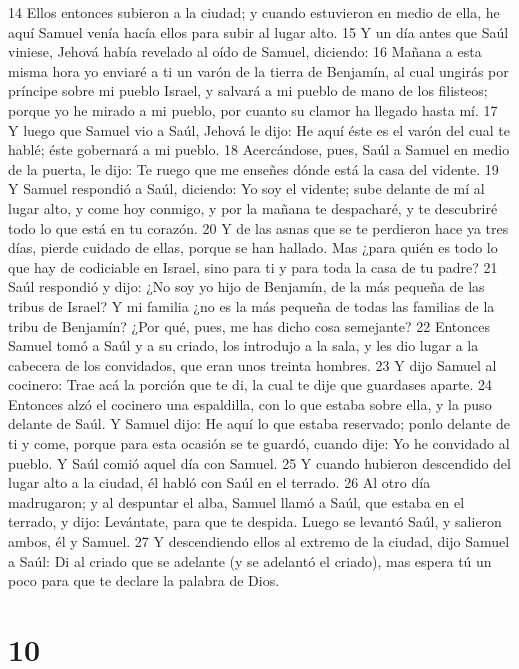 14 Ellos entonces subieron a la ciudad; y cuando estuvieron en medio de ella, he aquí Samuel venía hacía ellos para subir al lugar alto.
15 Y un día antes que Saúl viniese, Jehová había revelado al oído de Samuel, diciendo:
16 Mañana a esta misma hora yo enviaré a ti un varón de la tierra de Benjamín, al cual ungirás por príncipe sobre mi pueblo Israel, y salvará a mi pueblo de mano de los filisteos; porque yo he mirado a mi pueblo, por cuanto su clamor ha llegado hasta mí.
17 Y luego que Samuel vio a Saúl, Jehová le dijo: He aquí éste es el varón del cual te hablé; éste gobernará a mi pueblo.
18 Acercándose, pues, Saúl a Samuel en medio de la puerta, le dijo: Te ruego que me enseñes dónde está la casa del vidente.
19 Y Samuel respondió a Saúl, diciendo: Yo soy el vidente; sube delante de mí al lugar alto, y come hoy conmigo, y por la mañana te despacharé, y te descubriré todo lo que está en tu corazón.
20 Y de las asnas que se te perdieron hace ya tres días, pierde cuidado de ellas, porque se han hallado. Mas ¿para quién es todo lo que hay de codiciable en Israel, sino para ti y para toda la casa de tu padre?
21 Saúl respondió y dijo: ¿No soy yo hijo de Benjamín, de la más pequeña de las tribus de Israel? Y mi familia ¿no es la más pequeña de todas las familias de la tribu de Benjamín? ¿Por qué, pues, me has dicho cosa semejante?
22 Entonces Samuel tomó a Saúl y a su criado, los introdujo a la sala, y les dio lugar a la cabecera de los convidados, que eran unos treinta hombres.
23 Y dijo Samuel al cocinero: Trae acá la porción que te di, la cual te dije que guardases aparte.
24 Entonces alzó el cocinero una espaldilla, con lo que estaba sobre ella, y la puso delante de Saúl. Y Samuel dijo: He aquí lo que estaba reservado; ponlo delante de ti y come, porque para esta ocasión se te guardó, cuando dije: Yo he convidado al pueblo. Y Saúl comió aquel día con Samuel.
25 Y cuando hubieron descendido del lugar alto a la ciudad, él habló con Saúl en el terrado.
26 Al otro día madrugaron; y al despuntar el alba, Samuel llamó a Saúl, que estaba en el terrado, y dijo: Levántate, para que te despida. Luego se levantó Saúl, y salieron ambos, él y Samuel.
27 Y descendiendo ellos al extremo de la ciudad, dijo Samuel a Saúl: Di al criado que se adelante (y se adelantó el criado), mas espera tú un poco para que te declare la palabra de Dios.

\chapter{10}

